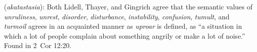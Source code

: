 \item[Uproar,]

(\textit{akatastasia}):
Both Lidell, Thayer, and Gingrich agree that the semantic values of \emph{unruliness}, \emph{unrest}, \emph{disorder}, \emph{disturbance}, \emph{instability},  \emph{confusion}, \emph{tumult}, and \emph{turmoil} agrees in an acquainted manner as \emph{uproar} is defined, as ``a situation in which a lot of people complain about something angrily or make a lot of noise.''
Found in 2~Cor 12:20.
